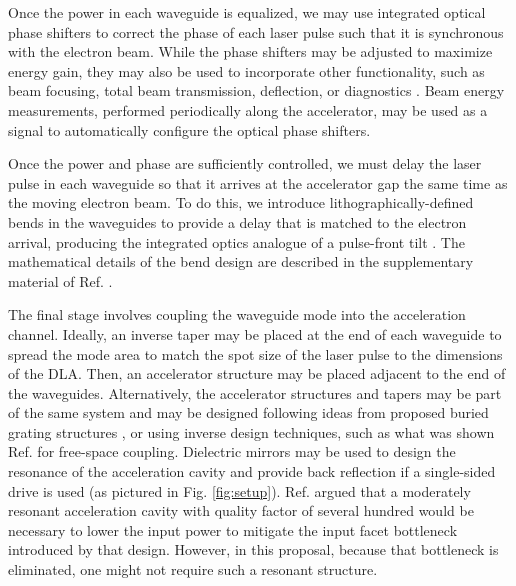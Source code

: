 Once the power in each waveguide is equalized, we may use integrated optical phase shifters to correct the phase of each laser pulse such that it is synchronous with the electron beam. While the phase shifters may be adjusted to maximize energy gain, they may also be used to incorporate other functionality, such as beam focusing, total beam transmission, deflection, or diagnostics \cite{soong2014electron, ye2018deep}.  Beam energy measurements, performed periodically along the accelerator, may be used as a signal to automatically configure the optical phase shifters.

Once the power and phase are sufficiently controlled, we must delay the laser pulse in each waveguide so that it arrives at the accelerator gap the same time as the moving electron beam. To do this, we introduce lithographically-defined bends in the waveguides to provide a delay that is matched to the electron arrival, producing the integrated optics analogue of a pulse-front tilt \cite{cesar_optical_2018}. The mathematical details of the bend design are described in the supplementary material of Ref. \cite{hughes_-chip_2018}.

The final stage involves coupling the waveguide mode into the acceleration channel.  Ideally, an inverse taper may be placed at the end of each waveguide to spread the mode area to match the spot size of the laser pulse to the dimensions of the DLA.  Then, an accelerator structure may be placed adjacent to the end of the waveguides.  Alternatively, the accelerator structures and tapers may be part of the same system and may be designed following ideas from proposed buried grating structures \cite{chang_silicon_2014}, or using inverse design techniques, such as what was shown Ref. \cite{hughes_method_2017} for free-space coupling.  Dielectric mirrors may be used to design the resonance of the acceleration cavity and provide back reflection if a single-sided drive is used \cite{yousefi2019dielectric} (as pictured in Fig. \ref{fig:setup}).  Ref. \cite{hughes_-chip_2018} argued that a moderately resonant acceleration cavity with quality factor of several hundred would be necessary to lower the input power to mitigate the input facet bottleneck introduced by that design.  However, in this proposal, because that bottleneck is eliminated, one might not require such a resonant structure.

